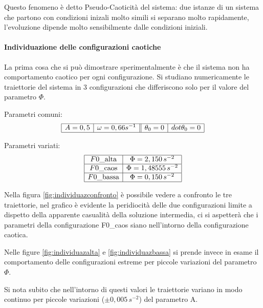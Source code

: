 \documentclass[11pt]{article}
\begin{document}
Questo fenomeno è detto Pseudo-Caoticità del sistema: due istanze di un sistema che partono con condizioni inizali molto simili si separano molto rapidamente, l'evoluzione dipende molto sensibilmente dalle condizioni iniziali.

\paragraph{Individuazione delle configurazioni caotiche}

La prima cosa che si può dimostrare sperimentalmente è che il sistema non ha comportamento caotico per ogni configurazione.
Si studiano numericamente le traiettorie del sistema in 3 configurazioni che differiscono solo per il valore del parametro $\Phi$.

Parametri comuni:
\begin{displaymath}
\begin{array}{|c|c| |c|c|}
\hline
A = 0,5 &  \omega = 0,66 s^{-1} & \theta_{0} = 0 & dot{\theta}_{0} = 0\\
\hline
\end{array}
\end{displaymath}

Parametri variati:
\begin{displaymath}
\begin{array}{|c|c|}
\hline
F0\_\textrm{alta} &  \Phi = 2,150 \, s^{-2}\\
\hline
F0\_\textrm{caos} &  \Phi = 1,48555\, s^{-2}\\
\hline
F0\_\textrm{bassa} &  \Phi = 0,150 \, s^{-2}\\
\hline
\end{array}
\end{displaymath}

Nella figura \ref{fig:individuazconfronto} è possibile vedere a confronto le tre traiettorie, nel grafico è evidente la peridiocità delle due configurazioni limite a dispetto della apparente casualità della soluzione intermedia, ci si aspetterà che i parametri della configurazione F0\_\textrm{caos} siano nell'intorno della configurazione caotica.

Nelle figure \ref{fig:individuazalta} e \ref{fig:individuazbassa} si prende invece in esame il comportamento delle configurazioni estreme per piccole variazioni del parametro $\Phi$. 

Si nota subito che nell'intorno di questi valori le traiettorie variano in modo continuo per piccole variazioni ($\pm 0,005 \, s^{-2}$) del parametro A.
\end{document}
